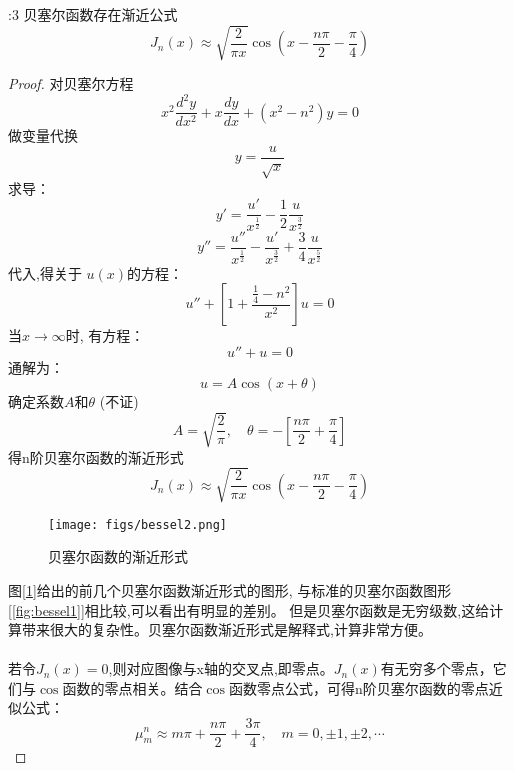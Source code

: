  \begin{proposition}:3 贝塞尔函数存在渐近公式
	\begin{equation*}
		J_{n}(x) \approx \sqrt{\frac{2}{\pi x}} \cos \left(x-\frac{n \pi}{2}-\frac{\pi}{4}\right)
	\end{equation*}
\end{proposition}
\begin{proof} 对贝塞尔方程
	\begin{equation*}
		x^2\frac{d^2y}{dx^2} + x\frac{dy}{dx} +(x^2 -n^2)y=0
	\end{equation*}
	做变量代换 \[ y=\frac{u}{\sqrt{x}}\] 
	求导：
	\[ y'=\frac{u'}{x^{\frac{1}{2}}} -\frac{1}{2}\frac{u}{x^{\frac{3}{2}}} \] 
	\[ y''=\frac{u''}{x^{\frac{1}{2}}} -\frac{u'}{x^{\frac{3}{2}}} + \frac{3}{4}\frac{u}{x^{\frac{5}{2}}} \] 
	代入,得关于 $u(x)$的方程：
	\begin{equation*}
		u'' +[1+\frac{\frac{1}{4}-n^2}{x^2}] u=0
	\end{equation*}
	当$x \to \infty $时, 有方程：
	\begin{equation*}
		u'' + u=0 
	\end{equation*}	
	通解为：\[u=A\cos(x+\theta)\]
	确定系数$A$和$\theta$ (不证)
	\[A =\sqrt{\frac{2}{\pi}}, \quad \theta = -[\frac{n \pi}{2}+\frac{\pi}{4}]  \]
	得n阶贝塞尔函数的渐近形式
	\begin{equation*}
		J_{n}(x) \approx \sqrt{\frac{2}{\pi x}} \cos \left(x-\frac{n \pi}{2}-\frac{\pi}{4}\right)
	\end{equation*}
	\begin{figure}[h]
		\centering
		\texttt{[image: figs/bessel2.png]}
		\caption{贝塞尔函数的渐近形式}
		\label{fig:bessel2}
	\end{figure}
	图[\ref{fig:bessel2}]给出的前几个贝塞尔函数渐近形式的图形, 与标准的贝塞尔函数图形[\ref{fig:bessel1}]相比较,可以看出有明显的差别。
	但是贝塞尔函数是无穷级数,这给计算带来很大的复杂性。贝塞尔函数渐近形式是解释式,计算非常方便。\\
	~~\\ 
	若令$J_{n}(x)=0$,则对应图像与x轴的交叉点,即零点。$J_{n}(x)$有无穷多个零点，它们与$\cos$函数的零点相关。结合$\cos$函数零点公式，可得n阶贝塞尔函数的零点近似公式：
	\begin{equation*}
		\mu_{m}^{n} \approx m \pi+\frac{n \pi}{2}+\frac{3 \pi}{4}, \quad m=0,\pm 1, \pm 2, \cdots 
	\end{equation*}
\end{proof}
~~\\ 

